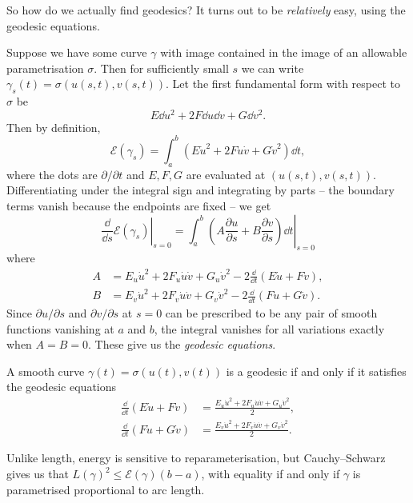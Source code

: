 So how do we actually find geodesics? It turns out to be \emph{relatively} easy, using the geodesic equations.

Suppose we have some curve $\gamma$ with image contained in the image of an allowable parametrisation $\sigma$. Then for sufficiently small $s$ we can write $\gamma_s(t) = \sigma(u(s, t), v(s, t))$. Let the first fundamental form with respect to $\sigma$ be
$$
E \dd u ^2 + 2F \dd u \dd v + G \dd v^2.
$$
Then by definition,
$$
\mathcal{E}(\gamma_s) = \int_a^b \left(E \dot{u}^2 + 2F \dot{u} \dot{v} + G \dot{v}^2\right) \dd t,
$$
where the dots are $\partial/\partial t$ and $E, F, G$ are evaluated at $(u(s,t), v(s,t))$. Differentiating under the integral sign and integrating by parts -- the boundary terms vanish because the endpoints are fixed -- we get
$$
\left.\frac{\dd}{\dd s} \mathcal{E}(\gamma_s) \right|_{s = 0} = \left.\int_a^b \left(A \frac{\partial u}{\partial s} + B \frac{\partial v}{\partial s}\right) \dd t \right|_{s = 0}
$$
where
\begin{align*}
    A &= E_u \dot{u}^2 + 2F_u \dot{u} \dot{v} + G_u \dot{v}^2 - 2 \frac{\dd}{\dd t} (E \dot{u} + F \dot{v}), \\
    B &= E_v \dot{u}^2 + 2F_v \dot{u} \dot{v} + G_v \dot{v}^2 - 2 \frac{\dd}{\dd t}(F \dot{u} + G\dot{v}).
\end{align*}
Since $\partial u/\partial s$ and $\partial v/\partial s$ at $s = 0$ can be prescribed to be any pair of smooth functions vanishing at $a$ and $b$, the integral vanishes for all variations exactly when $A = B = 0$. These give us the \emph{geodesic equations}.

\begin{theorem}
    A smooth curve $\gamma(t) = \sigma(u(t), v(t))$ is a geodesic if and only if it satisfies the geodesic equations
    \begin{align*}
        \frac{\dd}{\dd t} (E \dot{u} + F \dot{v}) &= \frac{
        E_u \dot{u}^2 + 2F_u \dot{u} \dot{v} + G_u \dot{v}^2}{2}, \\
        \frac{\dd}{\dd t}(F \dot{u} + G\dot{v})  &= \frac{E_v \dot{u}^2 + 2F_v \dot{u} \dot{v} + G_v \dot{v}^2}{2}.
    \end{align*}
\end{theorem}

Unlike length, energy is sensitive to reparameterisation, but Cauchy--Schwarz gives us that $L(\gamma)^2 \leq \mathcal{E}(\gamma) (b - a)$, with equality if and only if $\gamma$ is parametrised proportional to arc length.

